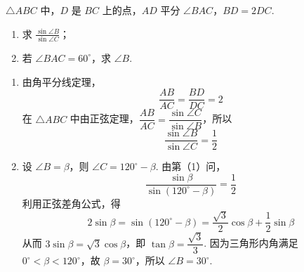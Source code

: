 \begin{problem}
\(\triangle ABC\) 中，\(D\) 是 \(BC\) 上的点，\(AD\) 平分 \(\angle BAC\)，\(BD = 2DC\).
\begin{enumerate}
\item 求 \(\frac{\sin\angle B}{\sin\angle C}\)；
\item 若 \(\angle BAC = 60^{\circ}\)，求 \(\angle B\).
\end{enumerate}
\end{problem}

\begin{solution}
\begin{enumerate}
\item 由角平分线定理，
\[
\frac{AB}{AC}=\frac{BD}{DC}=2
\]
在 \(\triangle ABC\) 中由正弦定理，\(\dfrac{AB}{AC}=\dfrac{\sin\angle C}{\sin\angle B}\)，所以
\[
\frac{\sin\angle B}{\sin\angle C}=\frac12
\]

\item 设 \(\angle B=\beta\)，则 \(\angle C=120^{\circ}-\beta\). 由第（1）问，
\[
\frac{\sin\beta}{\sin(120^{\circ}-\beta)}=\frac12
\]
利用正弦差角公式，得
\[
2\sin\beta=\sin(120^{\circ}-\beta)=\frac{\sqrt3}{2}\cos\beta+\frac12\sin\beta
\]
从而 \(3\sin\beta=\sqrt3\cos\beta\)，即 \(\tan\beta=\dfrac{\sqrt3}{3}\). 因为三角形内角满足 \(0^{\circ}<\beta<120^{\circ}\)，故 \(\beta=30^{\circ}\)，所以 \(\angle B=30^{\circ}\).
\end{enumerate}
\end{solution}

